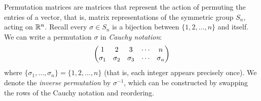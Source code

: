 
Permutation matrices are matrices that represent the action of permuting the entries of a vector, that is, matrix representations of the symmetric group $S_n$, acting on ${\mathbb R}^n$. Recall every $\ensuremath{\sigma} \ensuremath{\in} S_n$ is a bijection between $\{1,2,\ensuremath{\ldots},n\}$ and itself. We can write a permutation $\ensuremath{\sigma}$ in \emph{Cauchy notation}:
\[
\begin{pmatrix}
 1 & 2 & 3 & \ensuremath{\cdots} & n \cr
 \ensuremath{\sigma}_1 & \ensuremath{\sigma}_2 & \ensuremath{\sigma}_3 & \ensuremath{\cdots} & \ensuremath{\sigma}_n
 \end{pmatrix}
\]
where $\{\ensuremath{\sigma}_1,\ensuremath{\ldots},\ensuremath{\sigma}_n\} = \{1,2,\ensuremath{\ldots},n\}$ (that is, each integer appears precisely once). We denote the \emph{inverse permutation} by $\ensuremath{\sigma}^{-1}$, which can be constructed by swapping the rows of the Cauchy notation and reordering.


